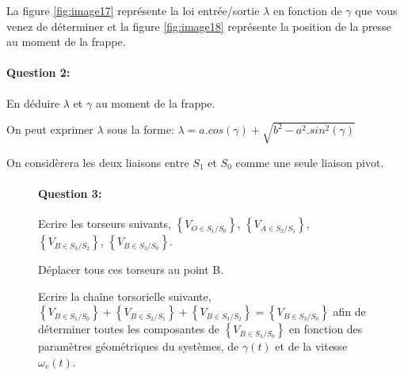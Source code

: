 La figure \ref{fig:image17} représente la loi entrée/sortie $\lambda$ en fonction de $\gamma$ que vous venez de déterminer et la 
figure \ref{fig:image18} représente la position de la presse au moment de la frappe.

\paragraph{Question 2:}

En déduire $\lambda$ et $\gamma$ au moment de la frappe.

On peut exprimer $\lambda$ sous la forme: $\lambda=a.cos(\gamma)+\sqrt{b^2-a^2.sin^2(\gamma)}$

On considèrera les deux liaisons entre $S_1$ et $S_0$ comme une seule liaison pivot.

\begin{figure}[htbp]
\begin{minipage}[c]{.55\linewidth}
\paragraph{Question 3:}

Ecrire les torseurs suivants, $\left\{V_{O\in S_1/S_0}\right\}$, $\left\{V_{A\in S_2/S_1}\right\}$, $\left\{V_{B\in S_3/S_2}\right\}$, $\left\{V_{B\in S_3/S_0}\right\}$.

Déplacer tous ces torseurs au point B.

Ecrire la chaîne torsorielle suivante, $\left\{V_{B\in S_1/S_0}\right\}+\left\{V_{B\in S_2/S_1}\right\}+\left\{V_{B\in S_3/S_2}\right\}=\left\{V_{B\in S_3/S_0}\right\}$ afin de déterminer toutes les composantes de $\left\{V_{B\in S_3/S_0}\right\}$ en fonction des paramètres géométriques du systèmes, de $\gamma(t)$ et de la vitesse $\omega_v(t)$.


\end{minipage}
\end{figure}
